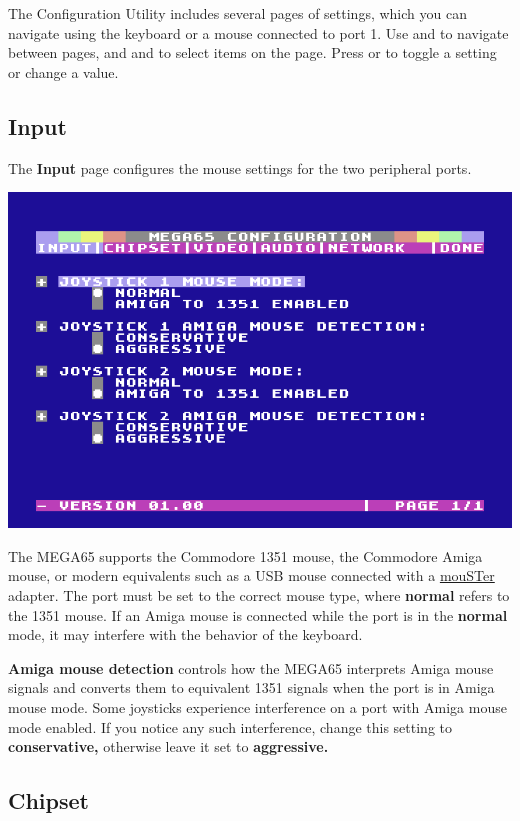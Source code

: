 The Configuration Utility includes several pages of settings, which you can navigate using the keyboard or a mouse connected to port 1. Use \megakey{$\leftarrow$} and \megakey{$\rightarrow$} to navigate between pages, and \megakey{$\uparrow$} and \megakey{$\downarrow$} to select items on the page. Press  or  to toggle a setting or change a value.

\subsection{Input}

The {\bf Input} page configures the mouse settings for the two peripheral ports.

\begin{center}
  \includegraphics[width=0.7\linewidth]{images/ss-m65config-1.png}
\end{center}

The MEGA65 supports the Commodore 1351 mouse, the Commodore Amiga mouse, or modern equivalents such as a USB mouse connected with a \href{https://retrohax.net/shop/amiga/mouster/}{mouSTer} adapter. The port must be set to the correct mouse type, where {\bf normal} refers to the 1351 mouse. If an Amiga mouse is connected while the port is in the {\bf normal} mode, it may interfere with the behavior of the keyboard.

{\bf Amiga mouse detection} controls how the MEGA65 interprets Amiga mouse signals and converts them to equivalent 1351 signals when the port is in Amiga mouse mode. Some joysticks experience interference on a port with Amiga mouse mode enabled. If you notice any such interference, change this setting to {\bf conservative,} otherwise leave it set to {\bf aggressive.}

\subsection{Chipset}

